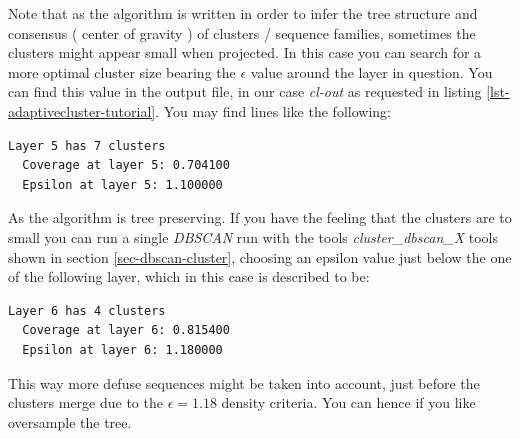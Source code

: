 Note that as the algorithm is written in order to infer the tree
structure and consensus ( center of gravity ) of clusters / sequence
families, sometimes the clusters might appear small when projected. In
this case you can search for a more optimal cluster size bearing the
$\epsilon$ value around the layer in question. You can find this value
in the output file, in our case \emph{cl-out} as requested in listing
\ref{lst-adaptivecluster-tutorial}. You may find lines like the
following:
\begin{lstlisting}
Layer 5 has 7 clusters
  Coverage at layer 5: 0.704100
  Epsilon at layer 5: 1.100000
\end{lstlisting}
As the algorithm is tree preserving. If you have the feeling that the
clusters are to small you can run a single \emph{DBSCAN} run
\cite{dbscan} with the tools \emph{cluster\_dbscan\_X} tools
shown in section \ref{sec-dbscan-cluster},
choosing an epsilon value just below the one of the following layer,
which in this case is described to be:
\begin{lstlisting}
Layer 6 has 4 clusters
  Coverage at layer 6: 0.815400
  Epsilon at layer 6: 1.180000
\end{lstlisting}
This way more defuse sequences might be taken into account, just
before the clusters merge due to the $\epsilon=1.18$ density
criteria. You can hence if you like oversample the tree.

